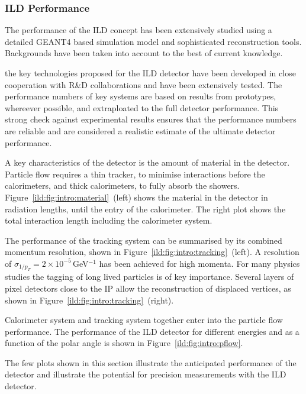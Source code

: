 
\subsubsection{ILD Performance}
The performance of the ILD concept has been extensively studied using a detailed GEANT4 based simulation model and sophisticated reconstruction tools. Backgrounds have been taken into account to the best of current knowledge. 

the key technologies proposed for the ILD detector have been developed in close cooperation with R\&D collaborations and have been extensively tested. The performance numbers of key systems are based on results from prototypes, whereever possible, and extraploated to the full detector performance. This strong check against experimental results ensures that the performance numbers are reliable and are considered a realistic estimate of the ultimate detector performance. 


A key characteristics of the detector is the amount of material in the detector. Particle flow requires a thin tracker, to minimise interactions before the calorimeters, and thick calorimeters, to fully absorb the showers. Figure~\ref{ild:fig:intro:material}~(left) shows the material in the detector in radiation lengths, until the entry of the calorimeter. The right plot shows the total interaction length including the calorimeter system. 

The performance of the tracking system can be summarised by its combined momentum resolution, shown in Figure~\ref{ild:fig:intro:tracking}~(left). A resolution of $\sigma_{1/p_T} = 2 \times 10^{-5}$\,GeV$^{-1}$ has been achieved for high momenta. For many physics studies the tagging of long lived particles is of key importance. Several layers of pixel detectors close to the IP allow the reconstruction of displaced vertices, as shown in Figure~\ref{ild:fig:intro:tracking}~(right).

Calorimeter system and tracking system together enter into the particle flow performance. The performance of the ILD detector for different energies and as a function of the polar angle is shown in Figure~\ref{ild:fig:intro:pflow}. 

The few plots shown in this section illustrate the anticipated performance of the detector and illustrate the potential for precision measurements with the ILD detector. 
